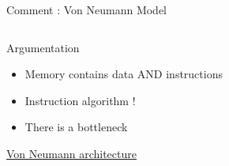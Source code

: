 \begin{Frame}{Comment :  Von Neumann Model}
  \begin{columns}[t]
    \begin{column}{\BW}
      \begin{block}{Argumentation}
        \begin{itemize}
        \item Memory contains data AND instructions
        \item Instruction algorithm !
        \item There is a bottleneck
        \end{itemize}
        \href{https://en.wikipedia.org/wiki/Von_Neumann_architecture}{Von
          Neumann architecture}
      \end{block}
      
    \end{column}
    \begin{column}{\BW}
      \begin{block}{}
      \end{block}
    \end{column}
  \end{columns}
\end{Frame}

